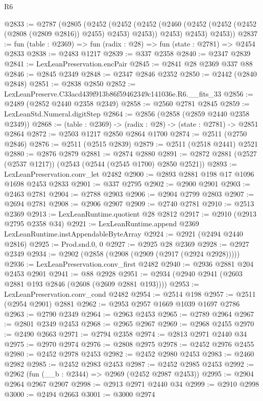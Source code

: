 \begin{lexlean}{R6}
\begin{coremodule}
@2833 := @2787
    (@2805
      (@2452
        (@2452
          (@2452 (@2460 (@2452 (@2452 (@2452 (@2808 (@2809 @2816)) @2455) @2453) @2453)) @2453)
          @2453)
        @2453))
@2837 := fun (table : @2369) => fun (radix : @28) => fun (state : @2781) => @2454 @2833
@2838 := @2483 @1217
@2839 := @337 @2358
@2840 := @2347 @2839
@2841 := LexLeanPreservation.encPair
@2845 := @2841 @28 @2369 @337 @88
@2846 := @2845 @2349
@2848 := @2347 @2846 @2352
@2850 := @2442 (@2840 @2848)
@2851 := @2838 @2850
@2852 := LexLeanPreserve.C33acd439f913b86f59462349c141036e.R6.__fits_33
@2856 := @2489 (@2852 @2440 @2358 @2349)
@2858 := @2560 @2781 @2845
@2859 := LexLeanStd.Numeral.digitStep
@2864 := @2856 (@2858 (@2859 @2440 @2358 @2349))
@2868 := (table : @2369) -> (radix : @28) -> (state : @2781) -> @2851 @2864
@2872 := @2503 @1217 @2850 @2864 @1700
@2874 := @2511 (@2750 @2846)
@2876 := @2511 (@2515 @2839)
@2879 := @2511 (@2518 @2441) @2521
@2880 := @2876 @2879
@2881 := @2874 @2880
@2891 := @2872 @2881 (@2527 (@2537 @1217)) (@2543 (@2544 (@2545 @1700) @2850 @2521))
@2893 := LexLeanPreservation.conv_let @2482
@2900 := @2893 @2881 @198 @17 @1096 @1698 @2453 @2833
@2901 := @337 @2795
@2902 := @2900 @2901
@2903 := @2463 @2781
@2904 := @2788 @2903
@2906 := @2904 @2799 @2803
@2907 := @2694 @2781
@2908 := @2906 @2907
@2909 := @2740 @2781
@2910 := @2513 @2369
@2913 := LexLeanRuntime.quotient @28 @2812
@2917 := @2910 (@2913 @2795 @2358 @34)
@2921 := LexLeanRuntime.append @2369 LexLeanRuntime.instAppendableByteArray
@2924 := @2921 (@2494 @2440 @2816)
@2925 := Prod.snd.{0, 0}
@2927 := @2925 @28 @2369
@2928 := @2927 @2349
@2934 := @2902 (@2858 (@2908 (@2909 (@2917 (@2924 @2928)))))
@2936 := LexLeanPreservation.conv_first @2482
@2940 := @2936 @2881 @204 @2453 @2901
@2941 := @88 @2928
@2951 := @2934 (@2940 @2941 (@2603 @2881 @193 @2846 (@2608 (@2609 @2881 @193))))
@2953 := LexLeanPreservation.conv_cond @2482
@2954 := @2514 @198
@2957 := @2511 (@2954 @2901) @2881
@2962 := @2953 @2957 @1669 @1039 @1697 @2786
@2963 := @2790 @2349
@2964 := @2963 @2453
@2965 := @2789 @2964
@2967 := @2801 @2349 @2453
@2968 := @2965 @2967
@2969 := @2968 @2455
@2970 := @2490 @2663
@2971 := @2794 @2358
@2974 := @2813 @2971 @2440 @34
@2975 := @2970 @2974
@2976 := @2808 @2975
@2978 := @2452 @2976 @2455
@2980 := @2452 @2978 @2453
@2982 := @2452 @2980 @2453
@2983 := @2460 @2982
@2985 := @2452 @2983 @2453
@2987 := @2452 @2985 @2453
@2992 := @2962 (fun (__b : @2344) => @2969 (@2452 @2987 @2453))
@2995 := @2904 @2964 @2967 @2907
@2998 := @2913 @2971 @2440 @34
@2999 := @2910 @2998
@3000 := @2494 @2663
@3001 := @3000 @2974

\end{coremodule}
\end{lexlean}

